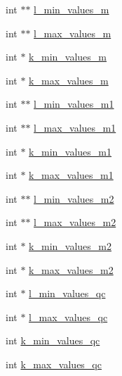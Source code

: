 \begin{DoxyCompactItemize}
\item 
int $\ast$$\ast$ \mbox{\hyperlink{struct_two_dpfold__vars_aed32884b31ad2191573ee972582bdead}{l\+\_\+min\+\_\+values\+\_\+m}}
\item 
int $\ast$$\ast$ \mbox{\hyperlink{struct_two_dpfold__vars_a2c193e0eb652690ceb166b2201e6206d}{l\+\_\+max\+\_\+values\+\_\+m}}
\item 
int $\ast$ \mbox{\hyperlink{struct_two_dpfold__vars_ab75ba9348ed6d32403910cee911e4561}{k\+\_\+min\+\_\+values\+\_\+m}}
\item 
int $\ast$ \mbox{\hyperlink{struct_two_dpfold__vars_af027f0a71e2b71cda705b6ce54ee9d08}{k\+\_\+max\+\_\+values\+\_\+m}}
\item 
int $\ast$$\ast$ \mbox{\hyperlink{struct_two_dpfold__vars_a5bbf929dd3419fc8e4437629b79117d2}{l\+\_\+min\+\_\+values\+\_\+m1}}
\item 
int $\ast$$\ast$ \mbox{\hyperlink{struct_two_dpfold__vars_afb84e7daa0115edd9c1f7c05c5a38a64}{l\+\_\+max\+\_\+values\+\_\+m1}}
\item 
int $\ast$ \mbox{\hyperlink{struct_two_dpfold__vars_a5b2cc962c440d4d382f91d3bb83fc626}{k\+\_\+min\+\_\+values\+\_\+m1}}
\item 
int $\ast$ \mbox{\hyperlink{struct_two_dpfold__vars_a479d9e1f8918141d4edb403e7ae17ffb}{k\+\_\+max\+\_\+values\+\_\+m1}}
\item 
int $\ast$$\ast$ \mbox{\hyperlink{struct_two_dpfold__vars_a23382c4abb1025dc70c80f123b7acb99}{l\+\_\+min\+\_\+values\+\_\+m2}}
\item 
int $\ast$$\ast$ \mbox{\hyperlink{struct_two_dpfold__vars_aee731ff9f9241e048fb4759a08122120}{l\+\_\+max\+\_\+values\+\_\+m2}}
\item 
int $\ast$ \mbox{\hyperlink{struct_two_dpfold__vars_aa081e5d2fa07f88aff3d385e7a46501f}{k\+\_\+min\+\_\+values\+\_\+m2}}
\item 
int $\ast$ \mbox{\hyperlink{struct_two_dpfold__vars_a5e7023ba4ca55d574b823d6824d5408f}{k\+\_\+max\+\_\+values\+\_\+m2}}
\item 
int $\ast$ \mbox{\hyperlink{struct_two_dpfold__vars_ac7fd855c314e33a89919836774436402}{l\+\_\+min\+\_\+values\+\_\+qc}}
\item 
int $\ast$ \mbox{\hyperlink{struct_two_dpfold__vars_ac313cb35daf31f90f3bbdd669f2efc84}{l\+\_\+max\+\_\+values\+\_\+qc}}
\item 
int \mbox{\hyperlink{struct_two_dpfold__vars_a81e4202585f908ee5e5df864549e85e8}{k\+\_\+min\+\_\+values\+\_\+qc}}
\item 
int \mbox{\hyperlink{struct_two_dpfold__vars_a49f2de79886106d8c883e3796e99cdaa}{k\+\_\+max\+\_\+values\+\_\+qc}}

\end{DoxyCompactItemize}

